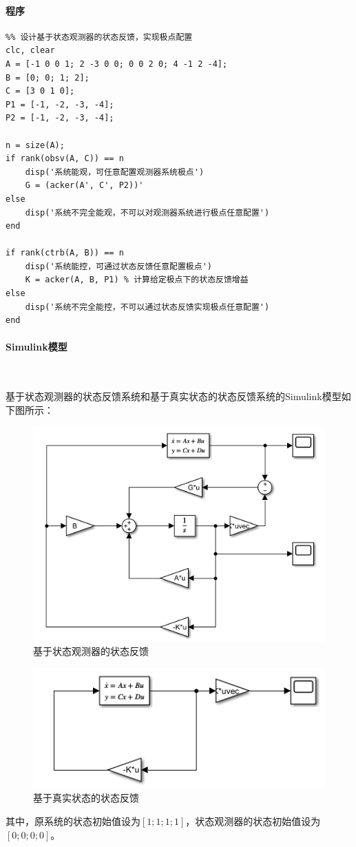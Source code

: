 \documentclass[UTF8]{article}
\begin{document}
\paragraph{程序}
\begin{lstlisting}
%% 设计基于状态观测器的状态反馈，实现极点配置
clc, clear
A = [-1 0 0 1; 2 -3 0 0; 0 0 2 0; 4 -1 2 -4];
B = [0; 0; 1; 2];
C = [3 0 1 0];
P1 = [-1, -2, -3, -4];
P2 = [-1, -2, -3, -4];

n = size(A);
if rank(obsv(A, C)) == n
    disp('系统能观，可任意配置观测器系统极点')
    G = (acker(A', C', P2))'
else
    disp('系统不完全能观，不可以对观测器系统进行极点任意配置')
end

if rank(ctrb(A, B)) == n
    disp('系统能控，可通过状态反馈任意配置极点')
    K = acker(A, B, P1) % 计算给定极点下的状态反馈增益
else
    disp('系统不完全能控，不可以通过状态反馈实现极点任意配置')
end
\end{lstlisting}

\paragraph{Simulink模型}~{}

基于状态观测器的状态反馈系统和基于真实状态的状态反馈系统的Simulink模型如下图所示：
\begin{figure}[H]
    \centering %
    \includegraphics[width=.6\textwidth]{figure/exp3_3_基于状态观测器的状态反馈.png} 
    \caption{基于状态观测器的状态反馈} %
\end{figure}
\begin{figure}[H]
    \centering %
    \includegraphics[width=.5\textwidth]{figure/exp3_3_基于真实状态的状态反馈.png} 
    \caption{基于真实状态的状态反馈} %
\end{figure}
其中，原系统的状态初始值设为$[1; 1; 1; 1]$，状态观测器的状态初始值设为$[0; 0; 0; 0]$。
\end{document}
